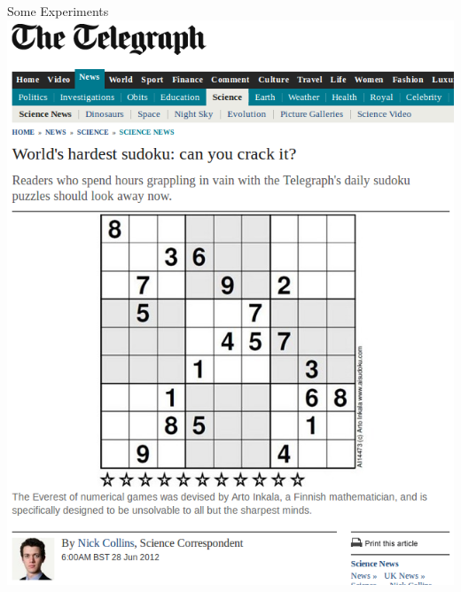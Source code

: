 \documentclass{beamer}
\begin{document}
\begin{frame}{Some Experiments}
     {
        \centering
        \includegraphics*[keepaspectratio=true,scale=0.24]{hardest.png}
    }
     {
        \begin{columns}
            \begin{column}{0.45\textwidth}
                
            \end{column}
            \begin{column}{0.45\textwidth}
            \end{column}
        \end{columns}
    }
\end{frame}
\end{document}
